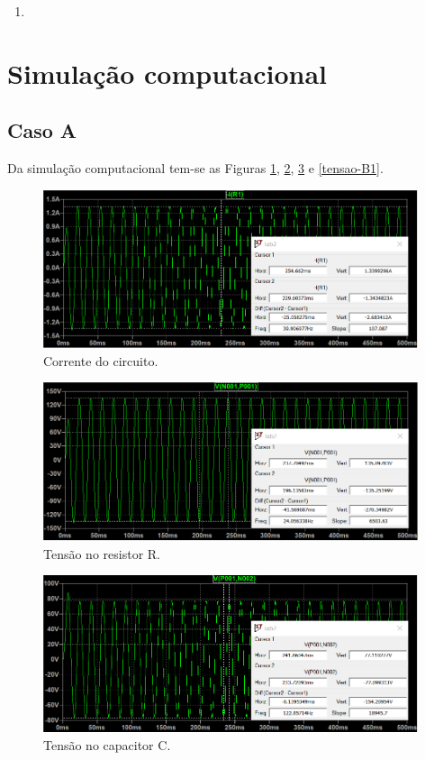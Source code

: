 \documentclass[a4paper,12pt,oneside,openany,table,xcdraw]{article}
\begin{document}
\begin{enumerate}[1 - ]
\item 

\end{enumerate}


\section{Simulação computacional} %

\subsection{Caso A}
Da simulação computacional tem-se as Figuras \ref{corrente1}, \ref{tensao-R1}, \ref{tensao-C1} e \ref{tensao-B1}.
\begin{figure}[H]
\centering
\captionsetup{font=scriptsize}
\includegraphics[width=11cm]{corrente1}
\caption{Corrente do circuito.}
\label{corrente1}
\end{figure}
\begin{figure}[H]
\centering
\captionsetup{font=scriptsize}
\includegraphics[width=11cm]{tensao-R1}
\caption{Tensão no resistor R.}
\label{tensao-R1}
\end{figure}
\begin{figure}[H]
\centering
\captionsetup{font=scriptsize}
\includegraphics[width=11cm]{tensao-C1}
\caption{Tensão no capacitor C.}
\label{tensao-C1}
\end{figure}
\end{document}
